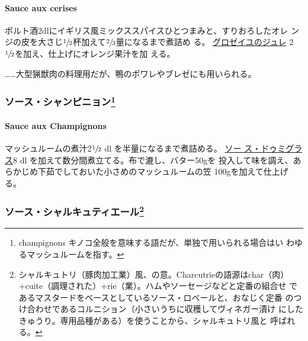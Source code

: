 \hypertarget{sauce-aux-cerises}{%
\paragraph{Sauce aux cerises}\label{sauce-aux-cerises}}


ポルト酒2dlにイギリス風ミックススパイスひとつまみと、すりおろしたオレ
ンジの皮を大さじ\(\sfrac{1}{2}\)杯加えて\(\sfrac{2}{3}\)量になるまで煮詰め
る。 \href{}{グロゼイユのジュレ}
2\(\sfrac{1}{2}\)を加え、仕上げにオレンジ果汁を加 える。

\ldots{}\ldots{}大型猟獣肉の料理用だが、鴨のポワレやブレゼにも用いられる。

\maeaki

\hypertarget{ux30bdux30fcux30b9ux30b7ux30e3ux30f3ux30d4ux30cbux30e7ux30f37}{%
\subsubsection[ソース・シャンピニョン]{\texorpdfstring{ソース・シャンピニョン\footnote{champignons
  キノコ全般を意味する語だが、単独で用いられる場合はい
  わゆるマッシュルームを指す。}}{ソース・シャンピニョン}}\label{ux30bdux30fcux30b9ux30b7ux30e3ux30f3ux30d4ux30cbux30e7ux30f37}}

\hypertarget{sauce-aux-champignons}{%
\paragraph{Sauce aux Champignons}\label{sauce-aux-champignons}}


マッシュルームの煮汁2\(\sfrac{1}{2}\) dl を半量になるまで煮詰める。
\protect\hyperlink{sauce-demi-glace}{ソー ス・ドゥミグラス}8 dl
を加えて数分間煮立てる。布で漉し、バター50gを
投入して味を調え、あらかじめ下茹でしておいた小さめのマッシュルームの笠
100gを加えて仕上げる。

\maeaki

\hypertarget{ux30bdux30fcux30b9ux30b7ux30e3ux30ebux30adux30e5ux30c6ux30a3ux30a8ux30fcux30eb8}{%
\subsubsection[ソース・シャルキュティエール]{\texorpdfstring{ソース・シャルキュティエール\footnote{シャルキュトリ（豚肉加工業）風、の意。Charcutrieの語源はchar（肉）
  +cuite（調理された）+rie（業）。ハムやソーセージなどと定番の組合せ
  であるマスタードをベースとしているソース・ロベールと、おなじく定番
  のつけ合わせであるコルニション（小さいうちに収穫してヴィネガー漬け
  にしたきゅうり。専用品種がある）を使うことから、シャルキュトリ風と
  呼ばれる。}}{ソース・シャルキュティエール}}\label{ux30bdux30fcux30b9ux30b7ux30e3ux30ebux30adux30e5ux30c6ux30a3ux30a8ux30fcux30eb8}}

